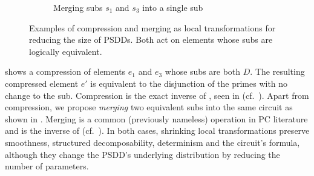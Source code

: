 \begin{figure}[t]
\begin{subfigure}{\textwidth}
    \caption{Merging subs $s_1$ and $s_3$ into a single sub}
    \label{fig:merge}
  \end{subfigure}
  \caption{Examples of compression  and merging  as local
    transformations for reducing the size of PSDDs. Both act on elements whose subs are logically
    equivalent.}
  \label{fig:compmerge}
\end{figure}

 shows a compression of elements $e_1$ and $e_3$ whose subs are both $D$. The
resulting compressed element $e'$ is equivalent to the disjunction of the primes with no change to
the sub. Compression is the exact inverse of , seen in  (cf.\
). Apart from compression, we propose \emph{merging} two equivalent subs into
the same circuit as shown in \Cref{fig:merge}. Merging is a common (previously nameless) operation
in PC literature and is the inverse of \textproc{Clone} (cf.\ \Cref{fig:splitclone}). In both
cases, shrinking local transformations preserve smoothness, structured decomposability, determinism
and the circuit's formula, although they change the PSDD's underlying distribution by reducing the
number of parameters.

